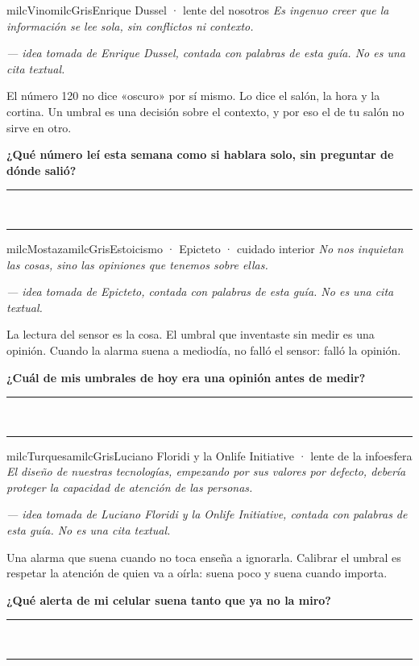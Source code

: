 \documentclass[11pt,letterpaper]{article}
\newcommand{\linead}[1]{\noindent\color{milcLinea}\rule{#1}{0.5pt}\color{milcNegro}}
\begin{document}
\begin{softbox}{milcVino}{milcGris}{Enrique Dussel · lente del nosotros}
\textit{Es ingenuo creer que la información se lee sola, sin conflictos ni contexto.}

{\footnotesize\itshape\color{milcNegro!70}--- idea tomada de Enrique Dussel, contada con palabras de esta guía. No es una cita textual.}

El número 120 no dice «oscuro» por sí mismo. Lo dice el salón, la hora y la cortina. Un umbral es una decisión sobre el contexto, y por eso el de tu salón no sirve en otro.

\textbf{¿Qué número leí esta semana como si hablara solo, sin preguntar de dónde salió?}
\end{softbox}
\linead{\linewidth}\\[1mm]
\linead{\linewidth}

\begin{softbox}{milcMostaza}{milcGris}{Estoicismo · Epicteto · cuidado interior}
\textit{No nos inquietan las cosas, sino las opiniones que tenemos sobre ellas.}

{\footnotesize\itshape\color{milcNegro!70}--- idea tomada de Epicteto, contada con palabras de esta guía. No es una cita textual.}

La lectura del sensor es la cosa. El umbral que inventaste sin medir es una opinión. Cuando la alarma suena a mediodía, no falló el sensor: falló la opinión.

\textbf{¿Cuál de mis umbrales de hoy era una opinión antes de medir?}
\end{softbox}
\linead{\linewidth}\\[1mm]
\linead{\linewidth}

\begin{softbox}{milcTurquesa}{milcGris}{Luciano Floridi y la Onlife Initiative · lente de la infoesfera}
\textit{El diseño de nuestras tecnologías, empezando por sus valores por defecto, debería proteger la capacidad de atención de las personas.}

{\footnotesize\itshape\color{milcNegro!70}--- idea tomada de Luciano Floridi y la Onlife Initiative, contada con palabras de esta guía. No es una cita textual.}

Una alarma que suena cuando no toca enseña a ignorarla. Calibrar el umbral es respetar la atención de quien va a oírla: suena poco y suena cuando importa.

\textbf{¿Qué alerta de mi celular suena tanto que ya no la miro?}
\end{softbox}
\linead{\linewidth}\\[1mm]
\linead{\linewidth}
\end{document}
